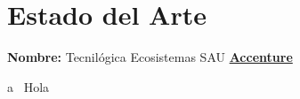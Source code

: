 \documentclass[a4paper, 12pt]{report} %
\begin{document}
	
	
        \tableofcontents
        \chapter{Estado del Arte}
	\textbf{Nombre:} Tecnilógica Ecosistemas SAU \href{https://www.accenture.com/es-es/company-tecnilogica-accenture}{\textbf{\color{blue}Accenture}}
	\par a~\cite{buffett84} Hola ~\cite{watson53}
	\printbibliography[heading=bibintoc]
\end{document}
